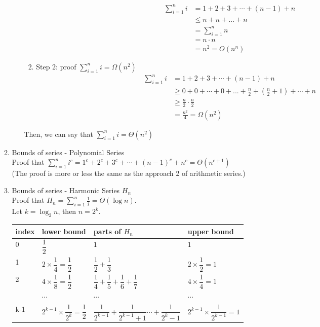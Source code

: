 \documentclass[11pt]{article}
\begin{document}
\begin{enumerate}
\begin{enumerate}
\begin{enumerate}
\begin{enumerate}
\begin{align*}
\sum_{i=1}^{n} i &= 1 +2 +3 + \cdots + (n-1) + n\\
& \leq n + n + ... + n\\
& = \sum_{i=1}^{n} n\\
& = n \cdot n \\
& = n^2 =O(n^{n})
\end{align*}
\item Step 2: proof $\sum_{i=1}^{n} i = \Omega(n^2)$
\begin{align*}
\sum_{i=1}^{n} i &= 1 +2 +3 + \cdots + (n-1) + n\\
& \geq 0+ 0 + \cdots + 0 +...+ \frac{n}{2} + (\frac{n}{2} +1) + \cdots +n \\
& \geq \frac{n}{2} \cdot \frac{n}{2} \\
& = \frac{n^2}{4} = \Omega(n^2)
\end{align*}
\end{enumerate}
Then, we can say that $\sum_{i=1}^{n} i = \Theta (n^2)$
\end{enumerate}
\item Bounds of series - Polynomial Series\\
Proof that $\sum_{i=1}^{n} i^{c} = 1^c +2^c +3^c + \cdots + (n-1)^c + n^c = \Theta (n^{c+1})$\\
(The proof is more or less the same as the approach 2 of arithmetic series.)
\item Bounds of series - Harmonic Series $H_n$\\
Proof that $H_{n} = \sum_{i=1}^{n} \frac{1}{i} = \Theta(\log n)$.\\
Let $k = \log_2 n$, then $n = 2^k$. \\
\begin{tabular}{|l|l|l|l|}
\hline
index&lower bound& parts of $H_n$& upper bound\\
\hline
0&$\dfrac{1}{2}$& $1$& $1$\\
\hline
1&$2 \times \dfrac{1}{4} = \dfrac{1}{2}$ &$\dfrac{1}{2}+ \dfrac{1}{3}$& $2 \times \dfrac{1}{2} = 1$\\
\hline
2&$4 \times \dfrac{1}{8} = \dfrac{1}{2}$ &$\dfrac{1}{4}+ \dfrac{1}{5}+ \dfrac{1}{6}+ \dfrac{1}{7}$& $4 \times \dfrac{1}{4} = 1$\\
\hline
&$\cdots$ & $\cdots$ & $\cdots$\\
\hline
k-1&$2^{k-1} \times \dfrac{1}{2^k} = \dfrac{1}{2}$ &$\dfrac{1}{2^{k-1}}+\dfrac{1}{2^{k-1}+1} \cdots +\dfrac{1}{2^{k} -1}$& $2^{k-1} \times \dfrac{1}{2^{k-1}} = 1$\\

\end{tabular}
\end{enumerate}
\end{enumerate}
\end{document}
